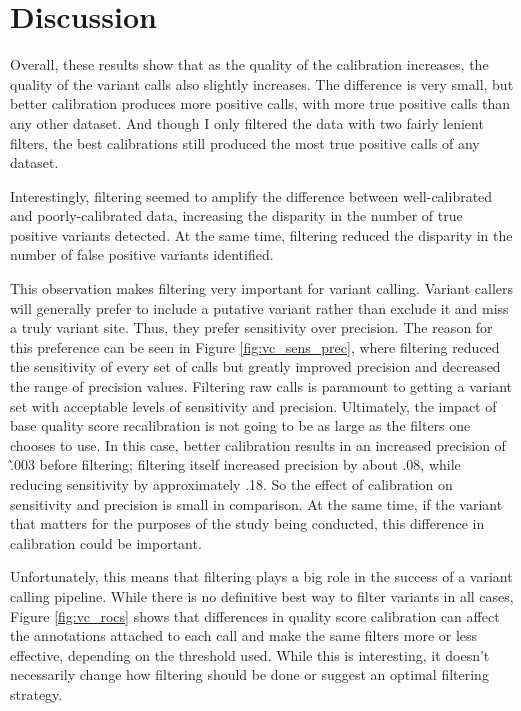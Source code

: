 \documentclass{report}
\begin{document}
\section{Discussion}
\begin{outline}


\item Overall, these results show that as the quality of the calibration increases, the quality of the variant calls also slightly increases. The difference is very small, but better calibration produces more positive calls, with more true positive calls than any other dataset. And though I only filtered the data with two fairly lenient filters, the best calibrations still produced the most true positive calls of any dataset.

\item Interestingly, filtering seemed to amplify the difference between well-calibrated and poorly-calibrated data, increasing the disparity in the number of true positive variants detected. At the same time, filtering reduced the disparity in the number of false positive variants identified.

\item This observation makes filtering very important for variant calling. Variant callers will generally prefer to include a putative variant rather than exclude it and miss a truly variant site. Thus, they prefer sensitivity over precision. The reason for this preference can be seen in Figure \ref{fig:vc_sens_prec}, where filtering reduced the sensitivity of every set of calls but greatly improved precision and decreased the range of precision values. Filtering raw calls is paramount to getting a variant set with acceptable levels of sensitivity and precision. Ultimately, the impact of base quality score recalibration is not going to be as large as the filters one chooses to use. In this case, better calibration results in an increased precision of \~.003 before filtering; filtering itself increased precision by about .08, while reducing sensitivity by approximately .18. So the effect of calibration on sensitivity and precision is small in comparison. At the same time, if the variant that matters for the purposes of the study being conducted, this difference in calibration could be important.

\item Unfortunately, this means that filtering plays a big role in the success of a variant calling pipeline. While there is no definitive best way to filter variants in all cases, Figure \ref{fig:vc_rocs} shows that differences in quality score calibration can affect the annotations attached to each call and make the same filters more or less effective, depending on the threshold used. While this is interesting, it doesn't necessarily change how filtering should be done or suggest an optimal filtering strategy.


\end{outline}
\end{document}
